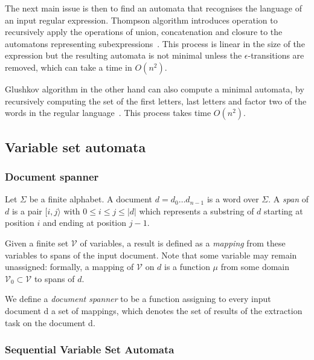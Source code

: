 \documentclass[12px]{article}
\begin{document}
        \vspace{0.5cm}

        The next main issue is then to find an automata that recognises the
        language of an input regular expression. Thompson algorithm introduces
        operation to recursively apply the operations of union, concatenation
        and closure to the automatons representing
        subexpressions~\cite{thompson1968programming}. This process is linear
        in the size of the expression but the resulting automata is not
        minimal unless the $\epsilon$-transitions are removed, which can take a
        time in $O(n^2)$.

        Glushkov algorithm in the other hand can also compute a minimal
        automata, by recursively computing the set of the first letters, last
        letters and factor two of the words in the regular
        language~\cite{glushkov1961abstract}. This
        process takes time $O(n^2)$.

    \subsection{Variable set automata}

      \subsubsection*{Document spanner}

        Let $\Sigma$ be a finite alphabet. A document $d = d_0 \dots d_{n-1}$
        is a word over $\Sigma$. A \textit{span} of $d$ is a pair $[i,
        j\rangle$ with $0 \leq i \leq j \leq |d|$ which represents a substring
        of $d$ starting at position $i$ and ending at position $j - 1$.

        Given a finite set $\mathcal{V}$ of variables, a result is defined as a
        \textit{mapping} from these variables to spans of the input document.
        Note that some variable may remain unassigned: formally, a mapping of
        $\mathcal{V}$ on $d$ is a function $\mu$ from some domain
        $\mathcal{V}_0 \subset \mathcal{V}$ to spans of $d$.

        We define a \textit{document spanner} to be a function assigning to
        every input document d a set of mappings, which denotes the set of
        results of the extraction task on the document d.

      \subsubsection*{Sequential Variable Set Automata}
\end{document}
